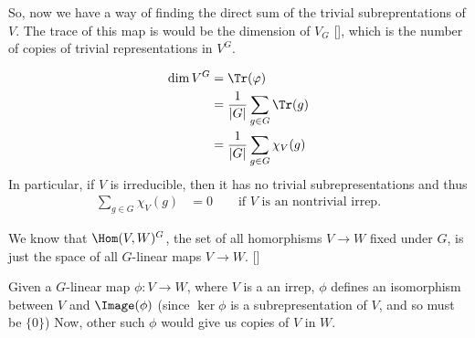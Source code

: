 So, now we have a way of finding the direct sum of the trivial subreprentations of $V$. The trace of this map is would be the dimension of $V_G$ [], which is the number of copies of trivial representations in $V^G$.

\begin{insight}
\end{insight}

\begin{align}
    \dim V^G &= \Tr (\varphi)\\
        &= \frac{1}{|G|}\sum_{g\in G} \Tr(g)\\
        &= \frac{1}{|G|}\sum_{g\in G}\chi_V(g)
        \label{eqn:dimV_G}
\end{align}
In particular, if $V$ is irreducible, then it has no trivial subrepresentations and thus
\begin{align}
    \sum_{g\in G} \chi_V(g) &= 0\quad\quad\text{if $V$ is an nontrivial irrep}.
\end{align}

We know that $\Hom(V,W)^G$, the set of all homorphisms $V\to W$ fixed under $G$, is just the space of all $G$-linear maps $V\to W$. []
\begin{insight}
    Given a $G$-linear map $\phi: V\to W$, where $V$ is a an irrep, $\phi$ defines an isomorphism between $V$ and $\Image(\phi)$ (since $\ker \phi$ is a subrepresentation of $V$, and so must be $\{0\}$) Now, other such $\phi$ would give us copies of $V$ in $W$. 
\end{insight}

